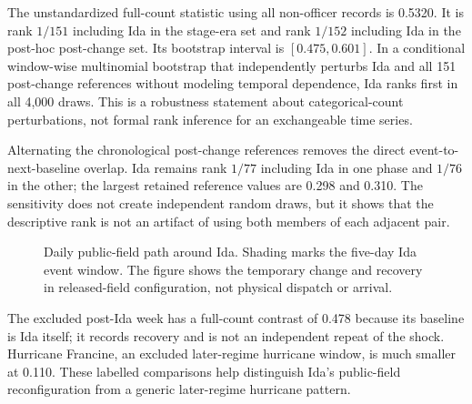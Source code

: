 \documentclass[11pt]{article}
\begin{document}
The unstandardized full-count statistic using all non-officer records is 0.5320. It is rank $1/151$ including Ida in the stage-era set and rank $1/152$ including Ida in the post-hoc post-change set. Its bootstrap interval is $[0.475,0.601]$. In a conditional window-wise multinomial bootstrap that independently perturbs Ida and all 151 post-change references without modeling temporal dependence, Ida ranks first in all 4,000 draws. This is a robustness statement about categorical-count perturbations, not formal rank inference for an exchangeable time series.

Alternating the chronological post-change references removes the direct event-to-next-baseline overlap. Ida remains rank $1/77$ including Ida in one phase and $1/76$ in the other; the largest retained reference values are 0.298 and 0.310. The sensitivity does not create independent random draws, but it shows that the descriptive rank is not an artifact of using both members of each adjacent pair.

\begin{figure}[t]
\centering
{}
\caption{Daily public-field path around Ida. Shading marks the five-day Ida event window. The figure shows the temporary change and recovery in released-field configuration, not physical dispatch or arrival.}
\label{fig:idapath}
\end{figure}

The excluded post-Ida week has a full-count contrast of 0.478 because its baseline is Ida itself; it records recovery and is not an independent repeat of the shock. Hurricane Francine, an excluded later-regime hurricane window, is much smaller at 0.110. These labelled comparisons help distinguish Ida's public-field reconfiguration from a generic later-regime hurricane pattern.
\end{document}
